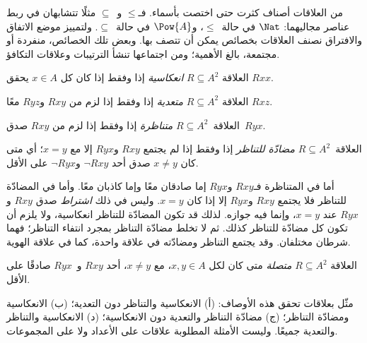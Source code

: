 \documentclass[../../../include/open-logic-section]{subfiles}
\begin{document}

\begin{intro}
من العلاقات أصناف كثرت حتى اختصت بأسماء. فـ$\le$ و~$\subseteq$
مثلًا تتشابهان في ربط عناصر مجاليهما: $\Nat$ في حالة~$\le$،
و$\Pow{A}$ في حالة~$\subseteq$. ولتمييز موضع الاتفاق والافتراق
نصنف العلاقات بخصائص يمكن أن تتصف بها. وبعض تلك الخصائص، منفردة
أو مجتمعة، بالغ الأهمية؛ ومن اجتماعها تنشأ الترتيبات وعلاقات التكافؤ.
\end{intro}

\begin{defn}[الانعكاسية]
العلاقة $R \subseteq A^2$ \emph{انعكاسية} إذا وفقط إذا كان كل $x \in
A$ يحقق $Rxx$.
\end{defn}

\begin{defn}[التعدية]
العلاقة $R \subseteq A^2$ \emph{متعدية} إذا وفقط إذا لزم من $Rxy$
و$Ryz$ معًا $Rxz$.
\end{defn}

\begin{defn}[التناظر]
العلاقة~$R \subseteq A^2$ \emph{متناظرة} إذا وفقط إذا لزم من
$Rxy$ صدق~$Ryx$.
\end{defn}

\begin{defn}
العلاقة~$R \subseteq A^2$ \emph{مضادّة\- للتناظر\-} إذا وفقط إذا لم
يجتمع $Rxy$ و$Ryx$ إلا مع $x=y$؛ أي متى كان $x\neq y$ صدق أحد
$\lnot Rxy$ و$\lnot Ryx$ على الأقل.
\end{defn}

\begin{explain}
أما في المتناظرة فـ$Rxy$ و$Ryx$ إما صادقان معًا وإما كاذبان معًا.
وأما في المضادّة للتناظر فلا يجتمع $Rxy$ و$Ryx$ إلا إذا كان
$x = y$. وليس في ذلك \emph{اشتراط} صدق $Rxy$ و$Ryx$ عند $x = y$،
وإنما فيه جوازه. لذلك قد تكون المضادّة للتناظر انعكاسية، ولا يلزم
أن تكون كل مضادّة للتناظر كذلك. ثم لا تخلط مضادّة التناظر بمجرد
انتفاء التناظر؛ فهما شرطان مختلفان. وقد يجتمع التناظر ومضادّته
في علاقة واحدة، كما في علاقة الهوية.
\end{explain}

\begin{defn}[الاتصالية]
العلاقة $R \subseteq A^2$ \emph{متصلة} متى كان لكل $x,y\in
A$، مع $x \neq y$، أحد $Rxy$ و~$Ryx$ صادقًا على الأقل.
\end{defn}

\begin{prob}
مثّل بعلاقات تحقق هذه الأوصاف: (أ) الانعكاسية والتناظر دون التعدية؛
(ب) الانعكاسية ومضادّة التناظر؛ (ج) مضادّة التناظر والتعدية دون
الانعكاسية؛ (د) الانعكاسية والتناظر والتعدية جميعًا. وليست الأمثلة
المطلوبة علاقات على الأعداد ولا على المجموعات.
\end{prob}
\end{document}
